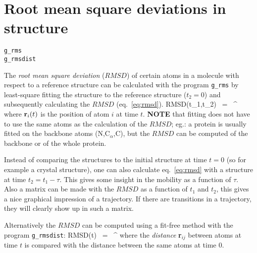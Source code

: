 \section{Root mean square deviations in structure}
\label{sec:rmsd}
\begin{verbatim}
g_rms
g_rmsdist
\end{verbatim}
The {\em root mean square deviation} ($RMSD$) of certain atoms in a molecule
with respect to a reference structure can be calculated with the program 
{\tt g\_rms} by least-square fitting the structure to the reference structure
($t_2 = 0$) and subsequently calculating the $RMSD$ (eq.~\ref{eq:rmsd}).
\beq
RMSD(t_1,t_2) ~=~ \left[\frac{1}{N} \sum_{i=1}^N ({\bf r}_i(t_1)-{\bf r}_i(t_2))^2 \right]^{}
\label{eq:rmsd}
\eeq
where ${\bf r}_i(t)$ is the position of atom $i$ at time $t$.
{\bf NOTE} that fitting does not have to use the same atoms as the calculation
of the $RMSD$; eg.: a protein is usually fitted on the backbone atoms
(N,C$_{\alpha}$,C), but the $RMSD$ can be computed of the backbone
or of the whole protein.

Instead of comparing the structures to the initial structure at time $t=0$ 
(so for example a crystal structure), one can also calculate eq.~\ref{eq:rmsd} 
with a structure at time $t_2=t_1-\tau$.
This gives some insight in the mobility as a function of $\tau$.
Also a matrix can be made with the $RMSD$ as a function of $t_1$ and $t_2$,
this gives a nice graphical impression of a trajectory.
If there are transitions in a trajectory, they will clearly show up in
such a matrix.

Alternatively the $RMSD$ can be computed using a fit-free method with the 
program {\tt g\_rmsdist}:
\beq
RMSD(t)	~=~	\left[\frac{1}{N^2}\sum_{i=1}^N	\sum_{j=1}^N	({\bf r}_{ij}(t)-{\bf r}_{ij}(0))^2\right]^{}
\label{eq:rmsdff}
\eeq
where the {\em distance} {\bf r}$_{ij}$ between atoms at time $t$ 
is compared with the distance between the same atoms at time $0$.

%
%
